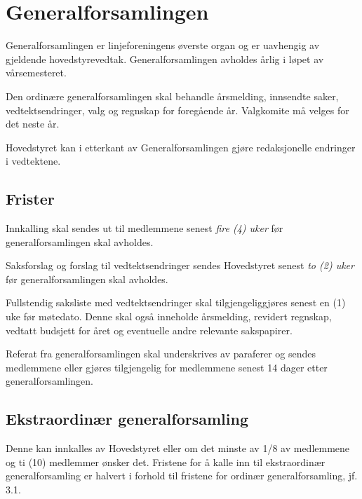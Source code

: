 \chapter{Generalforsamlingen}

Generalforsamlingen er linjeforeningens øverste organ og er uavhengig av gjeldende hovedstyrevedtak. Generalforsamlingen avholdes årlig i løpet av vårsemesteret.\newline

Den ordinære generalforsamlingen skal behandle årsmelding, innsendte saker, vedtektsendringer, valg og regnskap for foregående år. Valgkomite må velges for det neste år.

Hovedstyret kan i etterkant av Generalforsamlingen gjøre redaksjonelle endringer i vedtektene.  

\section{Frister}
\label{sec:frister}
\begin{liste}
	\item Innkalling skal sendes ut til medlemmene senest \emph{fire (4) uker}  før \mbox{generalforsamlingen} skal avholdes.
	\item Saksforslag og forslag til vedtektsendringer sendes Hovedstyret senest \emph{to (2) uker} før generalforsamlingen skal avholdes.
	\item Fullstendig saksliste med vedtektsendringer skal tilgjengeliggjøres senest en (1) uke før møtedato. Denne skal også inneholde årsmelding, revidert regnskap, vedtatt budsjett for året og eventuelle andre relevante sakspapirer.
	\item Referat fra generalforsamlingen skal underskrives av paraferer og sendes \linebreak medlemmene eller gjøres tilgjengelig for medlemmene senest 14 dager etter generalforsamlingen.
\end{liste}


\section{Ekstraordinær generalforsamling}
\vspace{23pt}
Denne kan innkalles av Hovedstyret eller om det minste av 1/8 av medlemmene og ti (10) medlemmer ønsker det. Fristene for å kalle inn til ekstraordinær generalforsamling er halvert i forhold til fristene for ordinær generalforsamling, jf. 3.1.\newline

